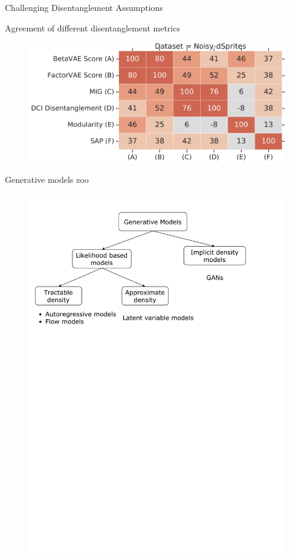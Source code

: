 \begin{frame}{Challenging Disentanglement Assumptions}
\begin{block}{Agreement of different disentanglement metrics}
	\begin{figure}
		\centering
		\includegraphics[width=0.9\linewidth]{figs/challenge_dis_3}
	\end{figure}
	\vspace{0.5cm}
\end{block}

\end{frame}
\begin{frame}{Generative models zoo}
	\begin{figure}
		\centering
		\includegraphics[width=1.0\linewidth]{figs/generative_models_zoo.pdf}
	\end{figure}
\end{frame}
